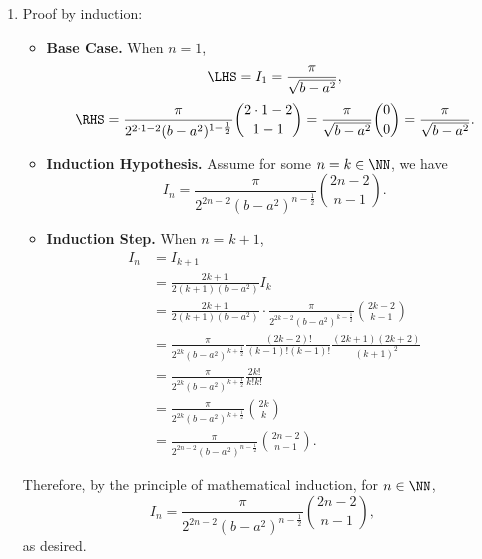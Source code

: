 \begin{enumerate}
    \item Proof by induction:
          \begin{itemize}
              \item \textbf{Base Case.} When \(n = 1\),
                    \[
                        \LHS = I_1 = \frac{\pi}{\sqrt{b - a^2}},
                    \]
                    \[
                        \RHS = \frac{\pi}{2^{2 \cdot 1 - 2} (b - a^2)^{1 - \frac{1}{2}}} \binom{2 \cdot 1 - 2}{1 - 1}
                        = \frac{\pi}{\sqrt{b - a^2}} \binom{0}{0}
                        = \frac{\pi}{\sqrt{b - a^2}}.
                    \]

              \item \textbf{Induction Hypothesis.} Assume for some \(n = k \in \NN\), we have
                    \[
                        I_n = \frac{\pi}{2^{2n - 2} (b - a^2)^{n - \frac{1}{2}}} \binom{2n - 2}{n - 1}.
                    \]

              \item \textbf{Induction Step.} When \(n = k + 1\),
                    \begin{align*}
                        I_n & = I_{k + 1}                                                                                                       \\
                            & = \frac{2k + 1}{2(k + 1)(b - a^2)} I_k                                                                            \\
                            & = \frac{2k + 1}{2(k + 1)(b - a^2)} \cdot \frac{\pi}{2^{2k - 2} (b - a^2)^{k - \frac{1}{2}}} \binom{2k - 2}{k - 1} \\
                            & = \frac{\pi}{2^{2k} (b - a^2)^{k + \frac{1}{2}}} \frac{(2k-2)!}{(k-1)!(k-1)!} \frac{(2k + 1)(2k + 2)}{(k + 1)^2}  \\
                            & = \frac{\pi}{2^{2k} (b - a^2)^{k + \frac{1}{2}}} \frac{2k!}{k!k!}                                                 \\
                            & = \frac{\pi}{2^{2k} (b - a^2)^{k + \frac{1}{2}}} \binom{2k}{k}                                                    \\
                            & = \frac{\pi}{2^{2n - 2} (b - a^2)^{n - \frac{1}{2}}} \binom{2n - 2}{n - 1}.
                    \end{align*}
          \end{itemize}

          Therefore, by the principle of mathematical induction, for \(n \in \NN\),
          \[
              I_n = \frac{\pi}{2^{2n - 2} (b - a^2)^{n - \frac{1}{2}}} \binom{2n - 2}{n - 1},
          \]
          as desired.
\end{enumerate}